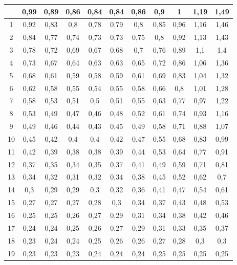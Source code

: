 \begin{longtable}[H]{|c|c|c|c|c|c|c|c|c|c|c|}
{    0 & 0,99 & 0,89 & 0,86 & 0,84 & 0,84 & 0,86 & 0,9 & 1 & 1,19 & 1,49  \\ \hline
    1 & 0,92 & 0,83 & 0,8 & 0,78 & 0,79 & 0,8 & 0,85 & 0,96 & 1,16 & 1,46  \\ \hline
    2 & 0,84 & 0,77 & 0,74 & 0,73 & 0,73 & 0,75 & 0,8 & 0,92 & 1,13 & 1,43  \\ \hline
    3 & 0,78 & 0,72 & 0,69 & 0,67 & 0,68 & 0,7 & 0,76 & 0,89 & 1,1 & 1,4  \\ \hline
    4 & 0,73 & 0,67 & 0,64 & 0,63 & 0,63 & 0,65 & 0,72 & 0,86 & 1,06 & 1,36  \\ \hline
    5 & 0,68 & 0,61 & 0,59 & 0,58 & 0,59 & 0,61 & 0,69 & 0,83 & 1,04 & 1,32  \\ \hline
    6 & 0,62 & 0,58 & 0,55 & 0,54 & 0,55 & 0,58 & 0,66 & 0,8 & 1,01 & 1,28  \\ \hline
    7 & 0,58 & 0,53 & 0,51 & 0,5 & 0,51 & 0,55 & 0,63 & 0,77 & 0,97 & 1,22  \\ \hline
    8 & 0,53 & 0,49 & 0,47 & 0,46 & 0,48 & 0,52 & 0,61 & 0,74 & 0,93 & 1,16  \\ \hline
    9 & 0,49 & 0,46 & 0,44 & 0,43 & 0,45 & 0,49 & 0,58 & 0,71 & 0,88 & 1,07  \\ \hline
    10 & 0,45 & 0,42 & 0,4 & 0,4 & 0,42 & 0,47 & 0,55 & 0,68 & 0,83 & 0,99  \\ \hline
    11 & 0,42 & 0,39 & 0,38 & 0,38 & 0,39 & 0,44 & 0,53 & 0,64 & 0,77 & 0,91  \\ \hline
    12 & 0,37 & 0,35 & 0,34 & 0,35 & 0,37 & 0,41 & 0,49 & 0,59 & 0,71 & 0,81  \\ \hline
    13 & 0,34 & 0,32 & 0,31 & 0,32 & 0,34 & 0,38 & 0,45 & 0,52 & 0,62 & 0,7  \\ \hline
    14 & 0,3 & 0,29 & 0,29 & 0,3 & 0,32 & 0,36 & 0,41 & 0,47 & 0,54 & 0,61  \\ \hline
    15 & 0,27 & 0,27 & 0,27 & 0,28 & 0,3 & 0,34 & 0,37 & 0,43 & 0,48 & 0,53  \\ \hline
    16 & 0,25 & 0,25 & 0,26 & 0,27 & 0,29 & 0,31 & 0,34 & 0,38 & 0,42 & 0,46  \\ \hline
    17 & 0,24 & 0,24 & 0,25 & 0,26 & 0,27 & 0,29 & 0,31 & 0,33 & 0,35 & 0,37  \\ \hline
    18 & 0,23 & 0,24 & 0,24 & 0,25 & 0,26 & 0,26 & 0,27 & 0,28 & 0,3 & 0,3  \\ \hline
    19  & 0,23 & 0,23 & 0,23 & 0,24 & 0,24 & 0,24 & 0,25 & 0,25 & 0,25 & 0,25 \\ \hline
    \end{longtable}


